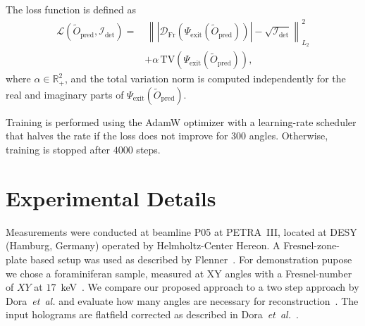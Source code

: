 \documentclass{article}
\begin{document}
The loss function is defined as
\begin{align}
\mathcal{L}\!\left( \tilde{O}_{\mathrm{pred}}, \mathcal{I}_{\mathrm{det}} \right)
 = &\, 
 \left\|
 \left|
 \mathcal{D}_{\mathrm{Fr}}\!\left(
 \Psi_{\mathrm{exit}}\!\left(
 \tilde{O}_{\mathrm{pred}}
 \right)
 \right)
 \right|
 -
 \sqrt{\mathcal{I}_{\mathrm{det}}}
 \right\|_{L_{2}}^{2} \\[0.5em]
 & + \alpha\, \mathrm{TV}\!\left(
 \Psi_{\mathrm{exit}}\!\left(
 \tilde{O}_{\mathrm{pred}}
 \right)
 \right),
 \label{eq:loss}
\end{align}
where $\alpha \in \mathbb{R}_{+}^{2}$, and the total variation norm is computed independently for the real and imaginary parts of $\Psi_{\mathrm{exit}}\!\left( \tilde{O}_{\mathrm{pred}} \right)$.  
 
Training is performed using the AdamW optimizer with a learning-rate scheduler that halves the rate if the loss does not improve for $300$ angles.  
Otherwise, training is stopped after $4000$ steps.  

\section{Experimental Details}
Measurements were conducted at beamline P05 at PETRA~III, located at DESY (Hamburg, Germany) operated by Helmholtz-Center Hereon.
A Fresnel-zone-plate based setup was used as described by Flenner~\cite{flennerHardXrayNanoholotomography2020b}.
For demonstration pupose we chose a foraminiferan sample, measured at XY angles with a Fresnel-number of $XY$ at $17$~keV~\cite{niEarlyDiagenesisForaminiferal2020}.
We compare our proposed approach to a two step approach by Dora~\textit{et~al.} and evaluate how many angles are necessary for reconstruction~\cite{doraArtifactsuppressingReconstructionStrongly2024}.
The input holograms are flatfield corrected as described in Dora~\textit{et~al.}~\cite{doraArtifactsuppressingReconstructionStrongly2024}.



\vfill\pagebreak

\label{sec:refs}


\end{document}
